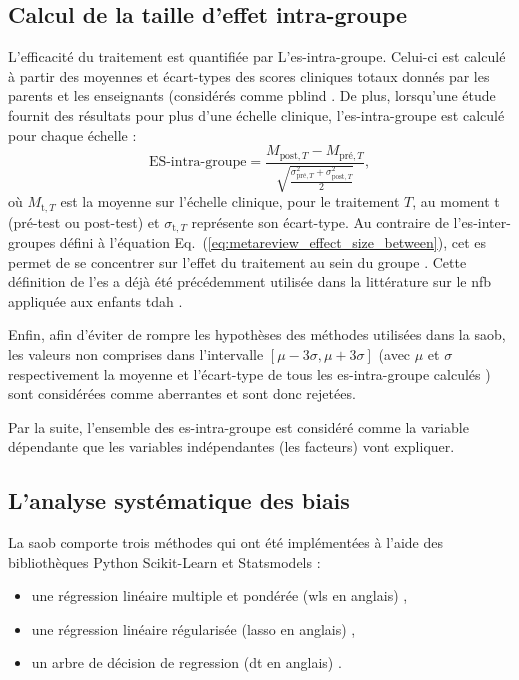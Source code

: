 \subsection{Calcul de la taille d'effet intra-groupe}

L'efficacité du traitement est quantifiée par L'\gls{es}-intra-groupe. Celui-ci est calculé à partir des moyennes et écart-types des scores 
cliniques totaux donnés par les parents et les enseignants (considérés comme \gls{pblind} \citep{Sonuga-Barke2013, Micoulaud2014, Cortese2016}. De plus, 
lorsqu'une étude fournit des résultats pour plus d'une échelle clinique, l'\gls{es}-intra-groupe est calculé pour chaque échelle :
\begin{equation}
\label{eq:factors_effect_size_within_subject}
\text{ES-intra-groupe} = \frac{M_{\text{post},T} - M_{\text{pré},T}}{\sqrt{\frac{\sigma_{\text{pré},T}^2 + \sigma_{\text{post},T}^2}{2}}},
\end{equation} 
\noindent où $M_{\text{t},T}$ est la moyenne sur l'échelle clinique, pour le traitement $T$, au moment t (pré-test ou post-test) et $\sigma_{\text{t},T}$ représente
son écart-type. Au contraire de l'\gls{es}-inter-groupes défini à l'équation Eq.~(\ref{eq:metareview_effect_size_between}), cet \gls{es} permet de se concentrer sur l'effet du 
traitement au sein du groupe \citep{Cohen1988}. Cette définition de l'\gls{es} a déjà été précédemment utilisée dans la littérature sur le \gls{nfb} 
appliquée aux enfants \gls{tdah} \citep{Arns2009, Maurizio2014, Strehl2017}. 

Enfin, afin d'éviter de rompre les hypothèses des méthodes utilisées dans la \gls{saob}, les valeurs non comprises dans l'intervalle 
$[\mu - 3 \sigma, \mu + 3 \sigma]$ (avec $\mu$ et $\sigma$ respectivement la moyenne et l'écart-type de tous les \gls{es}-intra-groupe calculés \citep{Shewhart1931})
sont considérées comme aberrantes et sont donc rejetées.

Par la suite, l'ensemble des \gls{es}-intra-groupe est considéré comme la variable dépendante que les variables indépendantes (les facteurs) vont expliquer. 

\subsection{L'analyse systématique des biais}

La \gls{saob} comporte trois méthodes qui ont été implémentées à l'aide des bibliothèques Python Scikit-Learn \citep[version 0.18.1]{Pedregosa2011} et Statsmodels \citep[version 0.8.0]{Seabold2010} : 
\begin{itemize}
  \item une régression linéaire multiple et pondérée (\gls{wls} en anglais) \citep{Montgomery2012},
	\item une régression linéaire régularisée (\gls{lasso} en anglais) \citep{Tibshirani1996},
	\item un arbre de décision de regression (\gls{dt} en anglais) \citep{Quinlan1986}.
\end{itemize}

